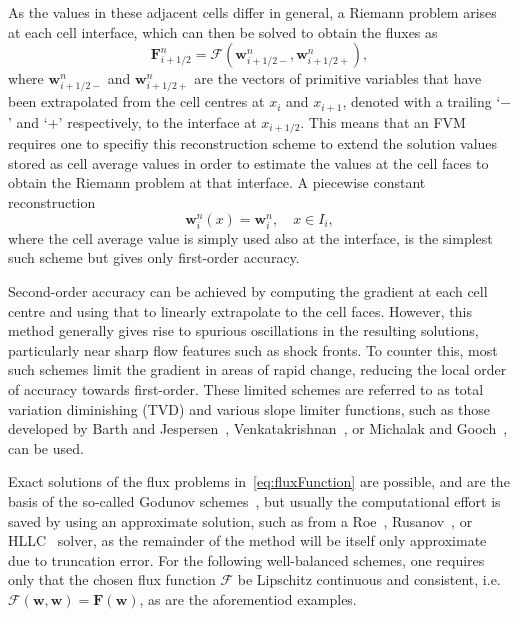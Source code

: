 As the values in these adjacent cells differ in general, a Riemann problem arises at each cell interface, which can then be solved to obtain the fluxes as
\begin{equation} \label{eq:fluxFunction}
\mathbf{F}_{i+1/2}^n=\bm{\mathcal{F}}\left(\mathbf{w}_{i+1/2-}^n,\mathbf{w}_{i+1/2+}^n\right),
\end{equation}
where $\mathbf{w}_{i+1/2-}^n$ and $\mathbf{w}_{i+1/2+}^n$ are the vectors of primitive variables that have been extrapolated from the cell centres at $x_i$ and $x_{i+1}$, denoted with a trailing `$-$' and `$+$' respectively, to the interface at $x_{i+1/2}$. This means that an FVM requires one to specifiy this reconstruction scheme to extend the solution values stored as cell average values in order to estimate the values at the cell faces to obtain the Riemann problem at that interface. A piecewise constant reconstruction
\begin{equation}
\mathbf{w}_i^n(x)=\mathbf{w}_i^n,\quad x\in I_i,
\end{equation}
where the cell average value is simply used also at the interface, is the simplest such scheme but gives only first-order accuracy.

Second-order accuracy can be achieved by computing the gradient at each cell centre and using that to linearly extrapolate to the cell faces. However, this method generally gives rise to spurious oscillations in the resulting solutions, particularly near sharp flow features such as shock fronts. To counter this, most such schemes limit the gradient in areas of rapid change, reducing the local order of accuracy towards first-order. These limited schemes are referred to as total variation diminishing (TVD) and various slope limiter functions, such as those developed by Barth and Jespersen~\cite{Barth1989}, Venkatakrishnan~\cite{Venkatakrishnan1993,Venkatakrishnan1995}, or Michalak and Gooch~\cite{Michalak2008}, can be used.

Exact solutions of the flux problems in~\eqref{eq:fluxFunction} are possible, and are the basis of the so-called Godunov schemes~\cite{Godunov1959}, but usually the computational effort is saved by using an approximate solution, such as from a Roe~\cite{Roe1981}, Rusanov~\cite{Rusanov1961}, or HLLC~\cite{Toro1994} solver, as the remainder of the method will be itself only approximate due to truncation error. For the following well-balanced schemes, one requires only that the chosen flux function $\bm{\mathcal{F}}$ be Lipschitz continuous and consistent, i.e.~$\bm{\mathcal{F}}(\mathbf{w},\mathbf{w})=\mathbf{F}(\mathbf{w})$, as are the aforementiod examples.


